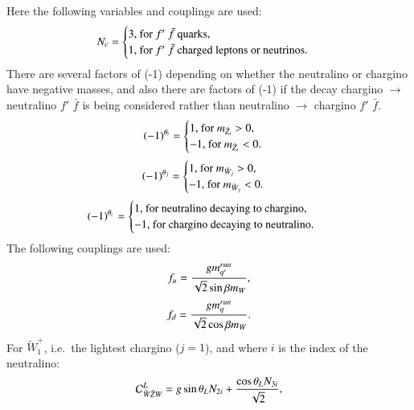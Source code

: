 \documentclass[final,3p,times,pdflatex]{elsarticle}
\begin{document}
Here the following variables and couplings are used:
\begin{equation}
N_{c} = \begin{cases}  3, $ for $f'$ $\bar{f}$ quarks, $\\
					   1, $ for $f'$ $\bar{f}$ charged leptons or neutrinos$. \\
						\end{cases}
\end{equation}
There are several factors of (-1) depending on whether the neutralino or chargino have negative masses, and also there are factors of (-1) if the decay chargino $\rightarrow$ neutralino $f'$ $\bar{f}$ is being considered rather than neutralino $\rightarrow$ chargino $f'$ $\bar{f}$.
\begin{equation}
(-1)^{\theta_i} = \begin{cases}	1, $ for $ m_{\tilde{Z}_i} > 0$,$ \\
								-1, $ for $ m_{\tilde{Z}_i} < 0. \\
								\end{cases}
\end{equation}
\begin{equation}
(-1)^{\theta_j} = \begin{cases}	1, $ for $ m_{\tilde{W}_j} > 0$,$ \\
								-1, $ for $m_{\tilde{W}_j} < 0. \\
								\end{cases}
\end{equation}
\begin{equation}
(-1)^{\theta_c} = \begin{cases} 1, $ for neutralino decaying to chargino, $\\
								-1, $ for chargino decaying to neutralino. $ \\
								\end{cases}
\end{equation}
The following couplings are used:
\begin{equation}
f_{u} = {g m_{q'}^{run} \over \sqrt{2} \sin\beta m_{W}},
\end{equation}
\begin{equation}
f_{d} = {g m_{q}^{run} \over \sqrt{2} \cos\beta m_{W}}.
\end{equation}
For $\tilde{W}^{+}_{1}$, i.e.\ the lightest chargino ($j = 1$), and where $i$ is the index of the neutralino:
\begin{equation}
\mathcal{C}_{\tilde{W} \tilde{Z} W}^L = g\sin\theta_L N_{2i} + {\cos\theta_L N_{3i} \over \sqrt{2}},
\end{equation}
\end{document}
